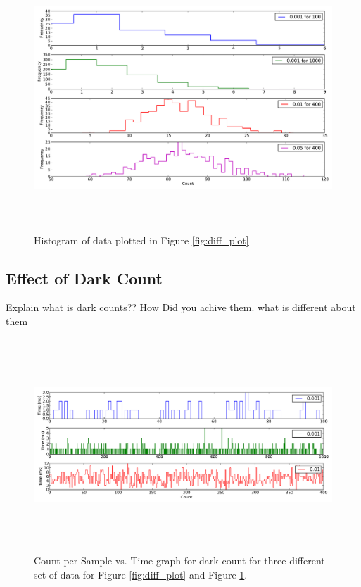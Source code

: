 \documentclass[a4paper,12pt]{article}
\begin{document}
\begin{figure}[H]
\centering
\includegraphics[angle=0,height=10cm,width=15.5cm]{graphs/diff_hist.pdf}
\caption{Histogram of data plotted in Figure \ref{fig:diff_plot}}
\label{fig:diff_hist}
\end{figure}


\subsection{Effect of Dark Count}
\label{sec:dark}
Explain what is dark counts?? How Did you achive them. what is different about them
\begin{figure}[H]
\centering
\includegraphics[angle=0,height=8cm,width=15.5cm]{graphs/dark_plots.pdf}
\caption{Count per Sample vs. Time graph for dark count  for three different set of data for Figure \ref{fig:diff_plot} and Figure \ref{fig:diff_hist}.}
\label{fig:dark_plot}
\end{figure}
\end{document}
